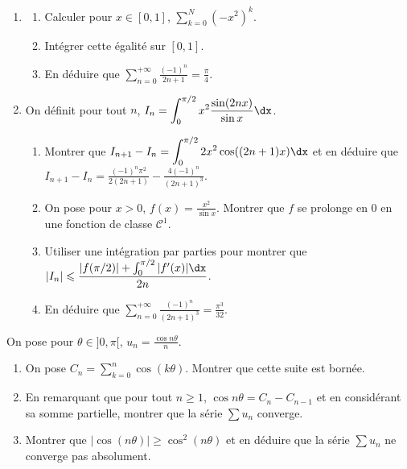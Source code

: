 \begin{exercice}
\begin{enumerate}
    \item
    \begin{enumerate}
        \item Calculer pour $x\in[0,1]$, $\displaystyle\sum_{k=0}^{N}\left(-x^{2}\right)^{k}$.
        \item Intégrer cette égalité sur $[0, 1]$.
        \item En déduire que $\displaystyle\sum_{n=0}^{+\infty}\frac{(-1)^{n}}{2n+1}=\frac{\pi}{4}$.

    \end{enumerate}
    
    \item On définit pour tout $n$, $\displaystyle I_{n}=\int_{0}^{\pi/2}x^{2}\frac{\sin(2nx)}{\sin x} \dx$.
    \begin{enumerate}
        \item Montrer que $\displaystyle I_{n+1}-I_{n}=\int_{0}^{\pi/2}2x^{2}\cos((2n+1)x) \dx$ 
        et en déduire que $I_{n+1}-I_{n}=\frac{(-1)^{n}\pi^{2}}{2(2n+1)}-\frac{4(-1)^{n}}{(2n+1)^{3}}$.
        \item On pose pour $x>0$, $f(x)=\frac{x^{2}}{\sin x}$. Montrer que $f$ se prolonge en 0 en une fonction de classe $\mathscr C^{1}$.
        \item Utiliser une intégration par parties pour montrer que $\displaystyle|I_{n}|\leqslant\frac{|f(\pi/2)|+\int_{0}^{\pi/2}|f^{\prime}(x)| \dx}{2n}$.
        \item En déduire que $\displaystyle\sum_{n=0}^{+\infty}\frac{(-1)^{n}}{(2n+1)^{3}}=\frac{\pi^{3}}{32}$. %
    \end{enumerate}
\end{enumerate}
\end{exercice}

\begin{exercice}
    On pose pour $\theta\in]0,\pi[$, $u_{n}=\frac{\cos n\theta}{n}$.
    \begin{enumerate}
        \item On pose $\displaystyle C_{n}=\sum_{k=0}^{n}\cos(k\theta)$. Montrer que cette suite est bornée.
        \item En remarquant que pour tout $n\geqslant1$, $\cos n\theta=C_{n}-C_{n-1}$ et en considérant sa somme partielle, 
            montrer que la série $\sum u_{n}$ converge.
        \item Montrer que $|\cos(n\theta)|\geqslant \cos^{2}(n\theta)$ et en déduire que la série $\sum u_{n}$ ne converge pas absolument.
    \end{enumerate}
\end{exercice}

